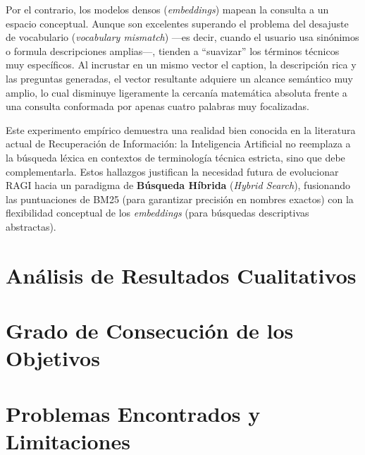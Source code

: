\documentclass[../main.tex]{subfiles}
\begin{document}
Por el contrario, los modelos densos (\textit{embeddings}) mapean la consulta a un espacio conceptual. Aunque son excelentes superando el problema del desajuste de vocabulario (\textit{vocabulary mismatch}) —es decir, cuando el usuario usa sinónimos o formula descripciones amplias—, tienden a ``suavizar'' los términos técnicos muy específicos. Al incrustar en un mismo vector el caption, la descripción rica y las preguntas generadas, el vector resultante adquiere un alcance semántico muy amplio, lo cual disminuye ligeramente la cercanía matemática absoluta frente a una consulta conformada por apenas cuatro palabras muy focalizadas.

Este experimento empírico demuestra una realidad bien conocida en la literatura actual de Recuperación de Información: la Inteligencia Artificial no reemplaza a la búsqueda léxica en contextos de terminología técnica estricta, sino que debe complementarla. Estos hallazgos justifican la necesidad futura de evolucionar RAGI hacia un paradigma de \textbf{Búsqueda Híbrida} (\textit{Hybrid Search}), fusionando las puntuaciones de BM25 (para garantizar precisión en nombres exactos) con la flexibilidad conceptual de los \textit{embeddings} (para búsquedas descriptivas abstractas).

\section{Análisis de Resultados Cualitativos}
\label{sec:resultados_cualitativos}

\section{Grado de Consecución de los Objetivos}
\label{sec:resultados_objetivos}

\section{Problemas Encontrados y Limitaciones}
\label{sec:resultados_problemas}
\end{document}
